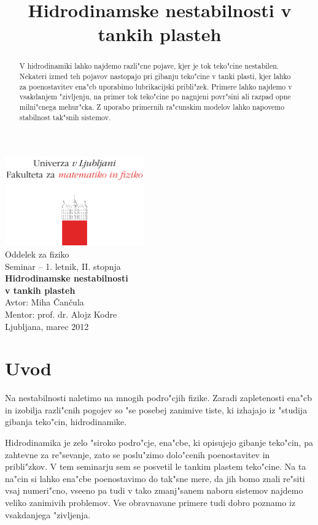 \documentclass[a4paper,12pt]{article}
\title{Hidrodinamske nestabilnosti v tankih plasteh}
\begin{document}
\begin{center}
\includegraphics[width=6cm]{../logo_fmf_uni-lj_sl}\\[0.5cm]
Oddelek za fiziko \\[2cm]
{ \large Seminar -- 1. letnik, II. stopnja } \\[1cm]
{ \huge \bf Hidrodinamske nestabilnosti \\ v tankih plasteh}\\[2cm]
{\large Avtor: Miha \v Can\v cula}\\[0.6cm]
{\large Mentor: prof. dr. Alojz Kodre} \\[0.6cm]
{\large Ljubljana, marec 2012}
\end{center}
\vfill

\begin{abstract}

V hidrodinamiki lahko najdemo razli"cne pojave, kjer je tok teko"cine nestabilen. Nekateri izmed teh pojavov nastopajo pri gibanju teko"cine v tanki plasti, kjer lahko za poenostavitev ena"cb uporabimo lubrikacijski pribli"zek. Primere lahko najdemo v vsakdanjem "zivljenju, na primer tok teko"cine po nagnjeni povr"sini ali razpad opne milni"cnega mehur"cka. Z uporabo primernih ra"cunskim modelov lahko napovemo stabilnost tak"snih sistemov. 


\end{abstract}

\newpage

\tableofcontents

\section{Uvod}

Na nestabilnosti naletimo na mnogih podro"cjih fizike. Zaradi zapletenosti ena"cb in izobilja razli"cnih pogojev so "se posebej zanimive tiste, ki izhajajo iz "studija gibanja teko"cin, hidrodinamike. 

Hidrodinamika je zelo "siroko podro"cje, ena"cbe, ki opisujejo gibanje teko"cin, pa zahtevne za re"sevanje, zato se poslu"zimo dolo"cenih poenostavitev in pribli"zkov. V tem seminarju sem se posvetil le tankim plastem teko"cine. Na ta na"cin si lahko ena"cbe poenostavimo do tak"sne mere, da jih bomo znali re"siti vsaj numeri"cno, vseeno pa tudi v tako zmanj"sanem naboru sistemov najdemo veliko zanimivih problemov. Vse obravnavane primere tudi dobro poznamo iz vsakdanjega "zivljenja. 
\end{document}
